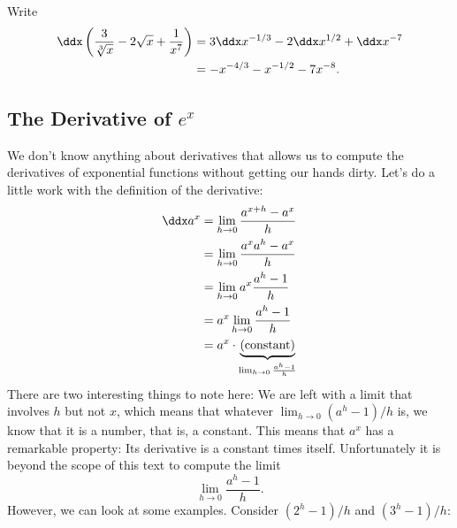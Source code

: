 \begin{solution}
Write
\begin{align*}
\ddx \left(\frac{3}{\sqrt[3]{x}}-2\sqrt{x}+\frac{1}{x^7}\right) &= 3\ddx x^{-1/3} -2\ddx x^{1/2}+\ddx x^{-7}\\
&=-x^{-4/3} - x^{-1/2}-7x^{-8}.
\end{align*}
\end{solution}



\subsection*{The Derivative of $\textit{e}^\textit{x}$}


We don't know anything about derivatives that allows us to compute the
derivatives of exponential functions without getting our hands
dirty. Let's do a little work with the definition of the derivative:
\begin{align*}
\ddx a^x &=\lim_{h\to 0} \frac{a^{x+h}-a^x}{h} \\
&=\lim_{h\to 0} \frac{a^xa^{h}-a^x}{h} \\
&=\lim_{h\to 0} a^x\frac{a^{h}-1}{h} \\
&=a^x\lim_{h\to 0} \frac{a^{h}-1}{h} \\
&=a^x \cdot \underbrace{\text{(constant)}}_{\lim_{h\to 0} \frac{a^{h}-1}{h}}
\end{align*}
There are two interesting things to note here: We are left with a
limit that involves $h$ but not $x$, which means that whatever $
\lim_{h\to 0} (a^h-1)/h$ is, we know that it is a number, that is, a
constant. This means that $a^x$ has a remarkable property: Its
derivative is a constant times itself. Unfortunately it is beyond the
scope of this text to compute the limit
\[
\lim_{h\to 0} \frac{a^h-1}{h}.
\]
However, we can look at some examples. Consider $(2^h-1)/h$ and $(3^h-1)/h$:
